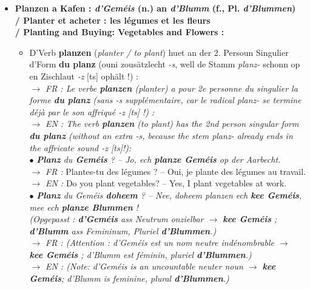 \begin{itemize}
    \vspace{0.3em}

    \item \textbf{Planzen a Kafen : \textit{d'Geméis} (n.) an \textit{d'Blumm} (f., Pl. \textit{d'Blummen}) \\
    / Planter et acheter : les légumes et les fleurs \\
    / Planting and Buying: Vegetables and Flowers :}
    \begin{itemize}
        \item D'Verb \textbf{planzen} (\textit{planter / to plant}) huet an der 2. Persoun Singulier d'Form \textbf{du planz} (ouni zousätzlecht \textit{-s}, well de Stamm \textit{planz-} schonn op en Zischlaut \textit{-z} {[ts]} ophält !) : \\
        $\rightarrow$ \textit{FR : Le verbe \textbf{planzen} (planter) a pour 2e personne du singulier la forme \textbf{du planz} (sans \textit{-s} supplémentaire, car le radical \textit{planz-} se termine déjà par le son affriqué \textit{-z} [ts] !) :} \\
        $\rightarrow$ \textit{EN : The verb \textbf{planzen} (to plant) has the 2nd person singular form \textbf{du planz} (without an extra \textit{-s}, because the stem \textit{planz-} already ends in the affricate sound \textit{-z} [ts]!):} \\
        $\bullet$ \textit{\textbf{Planz} du \textbf{Geméis} ? -- Jo, ech \textbf{planze Geméis} op der Aarbecht.} \\
        $\rightarrow$ \textit{FR :} Plantes-tu des légumes ? -- Oui, je plante des légumes au travail. \\
        $\rightarrow$ \textit{EN :} Do you plant vegetables? -- Yes, I plant vegetables at work. \\
        $\bullet$ \textit{\textbf{Planz} du Geméis \textbf{doheem} ? -- Nee, doheem planzen ech \textbf{kee Geméis}, mee ech \textbf{planze Blummen} !} \\
        \textit{(Opgepasst : \textbf{d'Geméis} ass Neutrum onzielbar $\rightarrow$ \textbf{kee Geméis} ; \textbf{d'Blumm} ass Femininum, Pluriel \textbf{d'Blummen}.)} \\
        $\rightarrow$ \textit{FR : (Attention : \textit{d'Geméis} est un nom neutre indénombrable $\rightarrow$ \textbf{kee Geméis} ; \textit{d'Blumm} est féminin, pluriel \textbf{d'Blummen}.)} \\
        $\rightarrow$ \textit{EN : (Note: \textit{d'Geméis} is an uncountable neuter noun $\rightarrow$ \textbf{kee Geméis}; \textit{d'Blumm} is feminine, plural \textbf{d'Blummen}.)} \\

\end{itemize}
\end{itemize}
